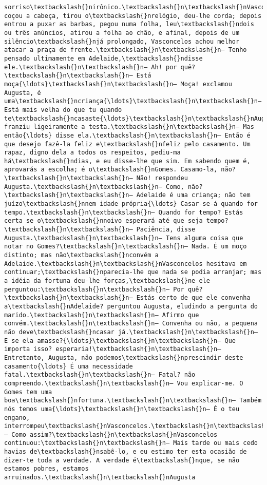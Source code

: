 \begin{Verbatim}[commandchars=\\\{\}]
sorriso\textbackslash{}nirônico.\textbackslash{}n\textbackslash{}nVasconcelos coçou a cabeça, tirou o\textbackslash{}nrelógio, deu-lhe corda; depois entrou a puxar as barbas, pegou numa folha, leu\textbackslash{}ndois ou três anúncios, atirou a folha ao chão, e afinal, depois de um silêncio\textbackslash{}njá prolongado, Vasconcelos achou melhor atacar a praça de frente.\textbackslash{}n\textbackslash{}n— Tenho pensado ultimamente em Adelaide,\textbackslash{}ndisse ele.\textbackslash{}n\textbackslash{}n— Ah! por quê?\textbackslash{}n\textbackslash{}n— Está moça{\ldots}\textbackslash{}n\textbackslash{}n— Moça! exclamou Augusta, é uma\textbackslash{}ncriança{\ldots}\textbackslash{}n\textbackslash{}n— Está mais velha do que tu quando te\textbackslash{}ncasaste{\ldots}\textbackslash{}n\textbackslash{}nAugusta franziu ligeiramente a testa.\textbackslash{}n\textbackslash{}n— Mas então{\ldots} disse ela.\textbackslash{}n\textbackslash{}n— Então é que desejo fazê-la feliz e\textbackslash{}nfeliz pelo casamento. Um rapaz, digno dela a todos os respeitos, pediu-ma há\textbackslash{}ndias, e eu disse-lhe que sim. Em sabendo quem é, aprovarás a escolha; é o\textbackslash{}nGomes. Casamo-la, não?\textbackslash{}n\textbackslash{}n— Não! respondeu Augusta.\textbackslash{}n\textbackslash{}n— Como, não?\textbackslash{}n\textbackslash{}n— Adelaide é uma criança; não tem juízo\textbackslash{}nnem idade própria{\ldots} Casar-se-á quando for tempo.\textbackslash{}n\textbackslash{}n— Quando for tempo? Estás certa se o\textbackslash{}nnoivo esperará até que seja tempo?\textbackslash{}n\textbackslash{}n— Paciência, disse Augusta.\textbackslash{}n\textbackslash{}n— Tens alguma coisa que notar no Gomes?\textbackslash{}n\textbackslash{}n— Nada. É um moço distinto; mas não\textbackslash{}nconvém a Adelaide.\textbackslash{}n\textbackslash{}nVasconcelos hesitava em continuar;\textbackslash{}nparecia-lhe que nada se podia arranjar; mas a idéia da fortuna deu-lhe forças,\textbackslash{}ne ele perguntou:\textbackslash{}n\textbackslash{}n— Por quê?\textbackslash{}n\textbackslash{}n— Estás certo de que ele convenha a\textbackslash{}nAdelaide? perguntou Augusta, eludindo a pergunta do marido.\textbackslash{}n\textbackslash{}n— Afirmo que convém.\textbackslash{}n\textbackslash{}n— Convenha ou não, a pequena não deve\textbackslash{}ncasar já.\textbackslash{}n\textbackslash{}n— E se ela amasse?{\ldots}\textbackslash{}n\textbackslash{}n— Que importa isso? esperaria!\textbackslash{}n\textbackslash{}n— Entretanto, Augusta, não podemos\textbackslash{}nprescindir deste casamento{\ldots} É uma necessidade fatal.\textbackslash{}n\textbackslash{}n— Fatal? não compreendo.\textbackslash{}n\textbackslash{}n— Vou explicar-me. O Gomes tem uma boa\textbackslash{}nfortuna.\textbackslash{}n\textbackslash{}n— Também nós temos uma{\ldots}\textbackslash{}n\textbackslash{}n— É o teu engano, interrompeu\textbackslash{}nVasconcelos.\textbackslash{}n\textbackslash{}n— Como assim?\textbackslash{}n\textbackslash{}nVasconcelos continuou:\textbackslash{}n\textbackslash{}n— Mais tarde ou mais cedo havias de\textbackslash{}nsabê-lo, e eu estimo ter esta ocasião de dizer-te toda a verdade. A verdade é\textbackslash{}nque, se não estamos pobres, estamos arruinados.\textbackslash{}n\textbackslash{}nAugusta 
\end{Verbatim}
